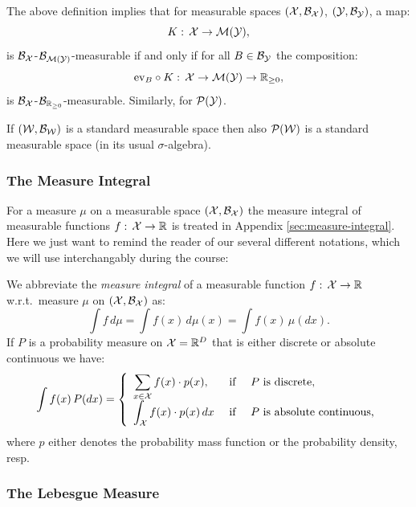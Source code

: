 \begin{Rem}
    \label{rem:prob-sigma-algebra}
    The above definition implies that for measurable spaces $(\mathcal{X},\mathcal{B}_{\mathcal{X}})$, $(\mathcal{Y},\mathcal{B}_{\mathcal{Y}})$, a map:
    \[ K:\, \mathcal{X} \to \mathcal{M}(\mathcal{Y}),\]
    is $\mathcal{B}_{\mathcal{X}}$-$\mathcal{B}_{\mathcal{M}(\mathcal{Y})}$-measurable if and only if for all $B \in \mathcal{B}_{\mathcal{Y}}$ the composition:
    \[ \mathrm{ev}_B \circ K:\, \mathcal{X} \to \mathcal{M}(\mathcal{Y}) \to \mathbb{R}_{\ge 0},   \]
    is $\mathcal{B}_{\mathcal{X}}$-$\mathcal{B}_{\mathbb{R}_{\ge 0}}$-measurable. Similarly, for $\mathcal{P}(\mathcal{Y})$.
\end{Rem}

\begin{Thm}
    If $(\mathcal{W},\mathcal{B}_{\mathcal{W}})$ is a standard measurable space then also $\mathcal{P}(\mathcal{W})$ is a standard 
    measurable space (in its usual $\sigma$-algebra).
\end{Thm}



\subsubsection{The Measure Integral}

For a measure $\mu$ on a measurable space $(\mathcal{X},\mathcal{B}_{\mathcal{X}})$ the measure integral of measurable functions 
$f:\, \mathcal{X} \to \mathbb{R}$ is treated in Appendix \ref{sec:measure-integral}.
Here we just want to remind the reader of our several different notations, which we will use interchangably during the course:

\begin{Not}
 We abbreviate the \emph{measure integral} of a measurable function $f:\, \mathcal{X} \to \mathbb{R}$ 
 w.r.t.\ measure $\mu$ on $(\mathcal{X},\mathcal{B}_{\mathcal{X}})$ as:
 \[ \int f \,d\mu = \int f(x)\,d\mu(x) = \int f(x)\,\mu(dx).\]
 If $P$ is a probability measure on $\mathcal{X}=\mathbb{R}^D$ that is either discrete or absolute continuous we have:
 \[ \int f(x)\, P(dx) = \left\{
         \begin{array}{lcl}
             \displaystyle\sum_{ x \in \mathcal{X}} f(x) \cdot p(x),& \text{ if }& P \text{ is discrete},\\
             \displaystyle\int_{\mathcal{X}} f(x) \cdot p(x) \, dx & \text{ if }& P \text{ is absolute continuous,}
         \end{array}
 \right. \]
 where $p$ either denotes the probability mass function or the probability density, resp.
\end{Not}

\subsubsection{The Lebesgue Measure}

